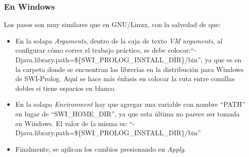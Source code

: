 \subsubsection{En Windows}

Los pasos son muy similares que en GNU/Linux, con la salvedad de que:

\begin{itemize}

\item En la solapa \emph{Arguments}, dentro de la caja de texto \emph{VM
arguments}, al configurar cómo correr el trabajo práctico, se debe
colocar:\newline ``-Djava.library.path=\$\{SWI\_PROLOG\_INSTALL\_DIR\}/bin'',
ya que es en la carpeta  donde se encuentran las librerías en la
distribución para Windows de SWI-Prolog. Aquí se hace más énfasis en colocar la
ruta entre comillas dobles si tiene espacios en blanco.

\item En la solapa \emph{Environment} hay que agregar una variable con nombre
``PATH'' en lugar de ``SWI\_HOME\_DIR'', ya que esta última no parece ser
tomada en Windows. El valor de la misma es:\newline
``-Djava.library.path=\$\{SWI\_PROLOG\_INSTALL\_DIR\}/bin''

\item Finalmente, se aplican los cambios presionando en \emph{Apply}.

\end{itemize}

